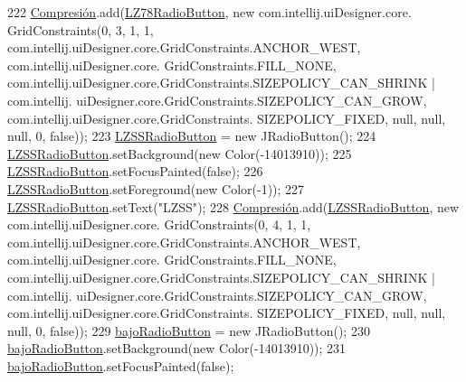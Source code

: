 \begin{DoxyCode}
222         \hyperlink{classpresentacion_1_1form_1_1PopUp__Comp_a5769b499f21466bae765c41428512966}{Compresión}.add(\hyperlink{classpresentacion_1_1form_1_1PopUp__Comp_ac750ecbde516e2fee470693124d2ff63}{LZ78RadioButton}, \textcolor{keyword}{new} com.intellij.uiDesigner.core.
      GridConstraints(0, 3, 1, 1, com.intellij.uiDesigner.core.GridConstraints.ANCHOR\_WEST, com.intellij.uiDesigner.core.
      GridConstraints.FILL\_NONE, com.intellij.uiDesigner.core.GridConstraints.SIZEPOLICY\_CAN\_SHRINK | com.intellij.
      uiDesigner.core.GridConstraints.SIZEPOLICY\_CAN\_GROW, com.intellij.uiDesigner.core.GridConstraints.
      SIZEPOLICY\_FIXED, null, null, null, 0, \textcolor{keyword}{false}));
223         \hyperlink{classpresentacion_1_1form_1_1PopUp__Comp_ad18c1029f04cc43d033183dca943977c}{LZSSRadioButton} = \textcolor{keyword}{new} JRadioButton();
224         \hyperlink{classpresentacion_1_1form_1_1PopUp__Comp_ad18c1029f04cc43d033183dca943977c}{LZSSRadioButton}.setBackground(\textcolor{keyword}{new} Color(-14013910));
225         \hyperlink{classpresentacion_1_1form_1_1PopUp__Comp_ad18c1029f04cc43d033183dca943977c}{LZSSRadioButton}.setFocusPainted(\textcolor{keyword}{false});
226         \hyperlink{classpresentacion_1_1form_1_1PopUp__Comp_ad18c1029f04cc43d033183dca943977c}{LZSSRadioButton}.setForeground(\textcolor{keyword}{new} Color(-1));
227         \hyperlink{classpresentacion_1_1form_1_1PopUp__Comp_ad18c1029f04cc43d033183dca943977c}{LZSSRadioButton}.setText(\textcolor{stringliteral}{"LZSS"});
228         \hyperlink{classpresentacion_1_1form_1_1PopUp__Comp_a5769b499f21466bae765c41428512966}{Compresión}.add(\hyperlink{classpresentacion_1_1form_1_1PopUp__Comp_ad18c1029f04cc43d033183dca943977c}{LZSSRadioButton}, \textcolor{keyword}{new} com.intellij.uiDesigner.core.
      GridConstraints(0, 4, 1, 1, com.intellij.uiDesigner.core.GridConstraints.ANCHOR\_WEST, com.intellij.uiDesigner.core.
      GridConstraints.FILL\_NONE, com.intellij.uiDesigner.core.GridConstraints.SIZEPOLICY\_CAN\_SHRINK | com.intellij.
      uiDesigner.core.GridConstraints.SIZEPOLICY\_CAN\_GROW, com.intellij.uiDesigner.core.GridConstraints.
      SIZEPOLICY\_FIXED, null, null, null, 0, \textcolor{keyword}{false}));
229         \hyperlink{classpresentacion_1_1form_1_1PopUp__Comp_add9532658d448dcbfa9b7dd40ddc8b38}{bajoRadioButton} = \textcolor{keyword}{new} JRadioButton();
230         \hyperlink{classpresentacion_1_1form_1_1PopUp__Comp_add9532658d448dcbfa9b7dd40ddc8b38}{bajoRadioButton}.setBackground(\textcolor{keyword}{new} Color(-14013910));
231         \hyperlink{classpresentacion_1_1form_1_1PopUp__Comp_add9532658d448dcbfa9b7dd40ddc8b38}{bajoRadioButton}.setFocusPainted(\textcolor{keyword}{false});

\end{DoxyCode}
